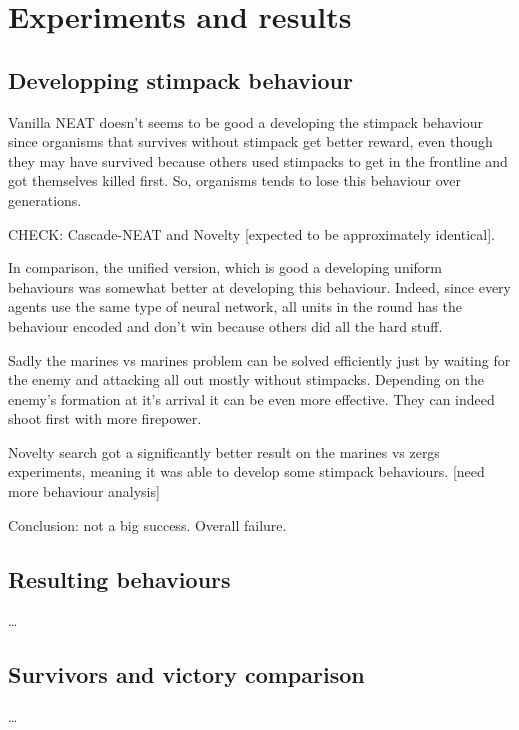 \section{Experiments and results}\label{section:experiments-results}

\subsection{Developping stimpack behaviour}

Vanilla NEAT doesn’t seems to be good a developing the stimpack behaviour since organisms that survives without stimpack get better reward,
even though they may have survived because others used stimpacks to get in the frontline and got themselves killed first.
So, organisms tends to lose this behaviour over generations.

CHECK: Cascade-NEAT and Novelty [expected to be approximately identical].

In comparison, the unified version, which is good a developing uniform behaviours was somewhat better at developing this behaviour.
Indeed, since every agents use the same type of neural network, all units in the round has the behaviour encoded and don’t win because others
did all the hard stuff.

Sadly the marines vs marines problem can be solved efficiently just by waiting for the enemy and attacking all out mostly without stimpacks.
Depending on the enemy’s formation at it’s arrival it can be even more effective. They can indeed shoot first with more firepower.

Novelty search got a significantly better result on the marines vs zergs experiments, meaning it was able to develop some stimpack behaviours. [need more behaviour analysis]

Conclusion: not a big success. Overall failure.

\subsection{Resulting behaviours}

…

\subsection{Survivors and victory comparison}

…

